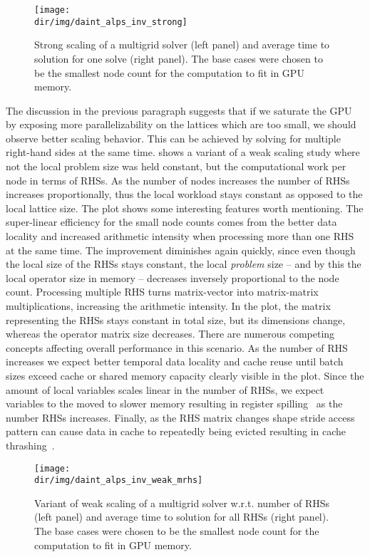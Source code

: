 \begin{figure}
    \centering
    \texttt{[image: \\dir/img/daint\_alps\_inv\_strong]}
    \caption{Strong scaling of a multigrid solver (left panel) and average time to solution for one solve (right panel). The base cases were chosen to be the smallest node count for the computation to fit in GPU memory. }
    \label{fig:daint:alps:inv:strong}
\end{figure}

The discussion in the previous paragraph suggests that if we saturate the GPU by exposing more parallelizability on the lattices which are too small, we should observe better scaling behavior.
This can be achieved by solving for multiple right-hand sides at the same time.
 shows a variant of a weak scaling study where not the local problem size was held constant, but the computational work per node in terms of RHSs.
As the number of nodes increases the number of RHSs increases proportionally, thus the local workload stays constant as opposed to the local lattice size.
The plot shows some interesting features worth mentioning.
The super-linear efficiency for the small node counts comes from the better data locality and increased arithmetic intensity when processing more than one RHS at the same time.
The improvement diminishes again quickly, since even though the local size of the RHSs stays constant, the local \emph{problem} size -- and by this the local operator size in memory -- decreases inversely proportional to the node count.
Processing multiple RHS turns matrix-vector into matrix-matrix multiplications, increasing the arithmetic intensity.
In the plot, the matrix representing the RHSs stays constant in total size, but its dimensions change, whereas the operator matrix size decreases.
There are numerous competing concepts affecting overall performance in this scenario.
As the number of RHS increases we expect better temporal data locality and cache reuse until batch sizes exceed cache or shared memory capacity clearly visible in the plot.
Since the amount of local variables scales linear in the number of RHSs, we expect variables to the moved to slower memory resulting in register spilling~\cite{CHAITIN198147} as the number RHSs increases.
Finally, as the RHS matrix changes shape stride access pattern can cause data in cache to repeatedly being evicted resulting in cache thrashing~\cite{10.1145/1476589.1476705}.
\begin{figure}
    \centering
    \texttt{[image: \\dir/img/daint\_alps\_inv\_weak\_mrhs]}
    \caption{Variant of weak scaling of a multigrid solver w.r.t. number of RHSs (left panel) and average time to solution for all RHSs (right panel). The base cases were chosen to be the smallest node count for the computation to fit in GPU memory. }
    \label{fig:daint:alps:inv:weak:mrhs}
\end{figure}


